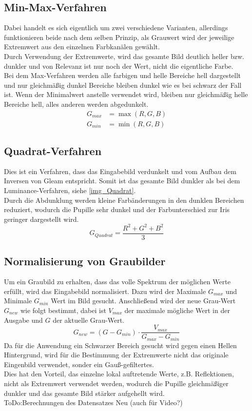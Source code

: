 \subsection{Min-Max-Verfahren}
\label{gray_MinMax}
Dabei handelt es sich eigentlich um zwei verschiedene Varianten, allerdings funktionieren beide nach dem selben Prinzip, als Grauwert wird der jeweilige Extremwert aus den einzelnen Farbkanälen gewählt.\\
Durch Verwendung der Extremwerte, wird das gesamte Bild deutlich heller bzw. dunkler und von Relevanz ist nur noch der Wert, nicht die eigentliche Farbe.\\
Bei dem Max-Verfahren werden alle farbigen und helle Bereiche hell dargestellt und nur gleichmäßig dunkel Bereiche bleiben dunkel wie es bei schwarz der Fall ist. Wenn der Minimalwert anstelle verwendet wird, bleiben nur gleichmäßig helle Bereiche hell, alles anderen werden abgedunkelt.
\begin{align*}
G_{max} &= \max(R,G,B)\\
G_{min} &= \min(R,G,B)
\end{align*}
\subsection{Quadrat-Verfahren}
\label{gray_Quadrat}
Dies ist ein Verfahren, dass das Eingabebild verdunkelt und vom Aufbau dem Inversen von Gleam entspricht. Somit ist das gesamte Bild dunkler als bei dem Luminance-Verfahren, siehe \autoref{img_Quadrat}.\\
Durch die Abdunklung werden kleine Farbänderungen in den dunklen Bereichen reduziert, wodurch die Pupille sehr dunkel und der Farbunterschied zur Iris geringer dargestellt wird.
\[G_{Quadrat}=\dfrac{R^2+G^2+B^2}{3}\]
\subsection{Normalisierung von Graubilder}
Um ein Graubild zu erhalten, dass das volle Spektrum der möglichen Werte erfüllt, wird das Eingabebild normalisiert. Dazu wird der Maximale $G_{max}$ und Minimale $G_{min}$ Wert im Bild gesucht. Anschließend wird der neue Grau-Wert $G_{new}$ wie folgt bestimmt, dabei ist $V_{max}$ der maximale mögliche Wert in der Ausgabe und $G$ der aktuelle Grau-Wert.
\[G_{new} = (G-G_{min})\cdot \dfrac{V_{max}}{G_{max}-G_{min}}\]
Da für die Anwendung ein Schwarzer Bereich gesucht wird gegen einen Hellen Hintergrund, wird für die Bestimmung der Extremwerte nicht das originale Eingenbild verwendet, sonder ein Gauß-gefiltertes.\\
Dies hat den Vorteil, das einzelne lokal auftretende Werte, z.B. Reflektionen, nicht als Extremwert verwendet werden, wodurch die Pupille gleichmäßiger dunkler und das gesamte Bild stärker aufgehellt wird.\\
ToDo:Berechnungen des Datensatzes Neu (auch für Video?)

